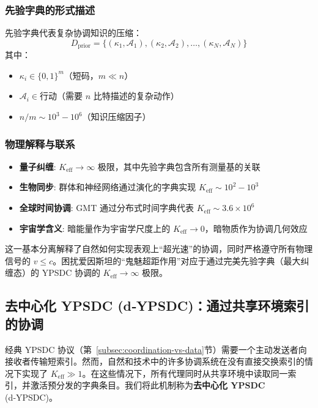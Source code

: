 \documentclass[11pt,a4paper]{article}
\begin{document}
	\subsubsection{先验字典的形式描述}
	
	先验字典代表复杂协调知识的压缩：
	\begin{equation}
		D_{\text{prior}} = \{(\kappa_1, \mathcal{A}_1), (\kappa_2, \mathcal{A}_2), \dots, (\kappa_N, \mathcal{A}_N)\}
	\end{equation}
	其中：
	\begin{itemize}
		\item $\kappa_i \in \{0,1\}^m$（短码，$m \ll n$）
		\item $\mathcal{A}_i \in \text{行动}$（需要 $n$ 比特描述的复杂动作）
		\item $n/m \sim 10^3-10^6$（知识压缩因子）
	\end{itemize}
	
	\subsubsection{物理解释与联系}
	
	\begin{itemize}
		\item \textbf{量子纠缠}: $K_{\mathrm{eff}} \to \infty$ 极限，其中先验字典包含所有测量基的关联
		\item \textbf{生物同步}: 群体和神经网络通过演化的字典实现 $K_{\mathrm{eff}} \sim 10^2-10^3$
		\item \textbf{全球时间协调}: GMT 通过分布式时间字典代表 $K_{\mathrm{eff}} \sim 3.6\times10^6$
		\item \textbf{宇宙学含义}: 暗能量作为宇宙学尺度上的 $K_{\mathrm{eff}} \to 0$，暗物质作为协调几何效应
	\end{itemize}
	
	这一基本分离解释了自然如何实现表观上“超光速”的协调，同时严格遵守所有物理信号的 $v \leq c$。困扰爱因斯坦的“鬼魅超距作用”对应于通过完美先验字典（最大纠缠态）的 YPSDC 协调的 $K_{\mathrm{eff}} \to \infty$ 极限。
	
	\subsection{去中心化 YPSDC (d‑YPSDC)：通过共享环境索引的协调}
	\label{subsec:d-ypsdc}
	
	经典 YPSDC 协议（第~\ref{subsec:coordination-vs-data}节）需要一个主动发送者向接收者传输短索引。然而，自然和技术中的许多协调系统在没有直接交换索引的情况下实现了 $K_{\mathrm{eff}} \gg 1$。在这些情况下，所有代理同时从共享环境中读取同一索引，并激活预分发的字典条目。我们将此机制称为\textbf{去中心化 YPSDC} (d‑YPSDC)。
	
\end{document}
